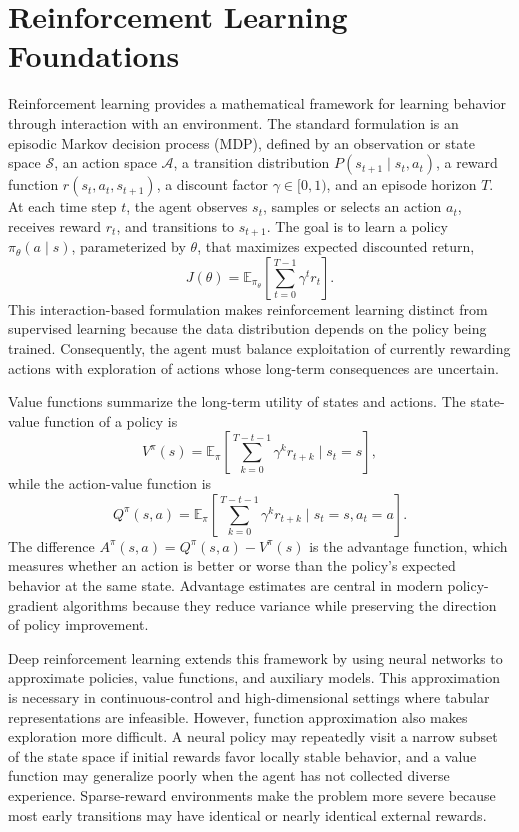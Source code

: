 \section{Reinforcement Learning Foundations}
\label{sec:reinforcement_learning_foundations}

Reinforcement learning provides a mathematical framework for learning behavior through interaction with an environment.
The standard formulation is an episodic Markov decision process (MDP), defined by an observation or state space $\mathcal{S}$, an action space $\mathcal{A}$, a transition distribution $P(s_{t+1}\mid s_t,a_t)$, a reward function $r(s_t,a_t,s_{t+1})$, a discount factor $\gamma\in[0,1)$, and an episode horizon $T$.
At each time step $t$, the agent observes $s_t$, samples or selects an action $a_t$, receives reward $r_t$, and transitions to $s_{t+1}$.
The goal is to learn a policy $\pi_\theta(a\mid s)$, parameterized by $\theta$, that maximizes expected discounted return,
\begin{equation}
    J(\theta)=\mathbb{E}_{\pi_\theta}\left[\sum_{t=0}^{T-1}\gamma^t r_t\right].
\end{equation}
This interaction-based formulation makes reinforcement learning distinct from supervised learning because the data distribution depends on the policy being trained.
Consequently, the agent must balance exploitation of currently rewarding actions with exploration of actions whose long-term consequences are uncertain.

Value functions summarize the long-term utility of states and actions.
The state-value function of a policy is
\begin{equation}
    V^\pi(s)=\mathbb{E}_{\pi}\left[\sum_{k=0}^{T-t-1}\gamma^k r_{t+k}\mid s_t=s\right],
\end{equation}
while the action-value function is
\begin{equation}
    Q^\pi(s,a)=\mathbb{E}_{\pi}\left[\sum_{k=0}^{T-t-1}\gamma^k r_{t+k}\mid s_t=s, a_t=a\right].
\end{equation}
The difference $A^\pi(s,a)=Q^\pi(s,a)-V^\pi(s)$ is the advantage function, which measures whether an action is better or worse than the policy's expected behavior at the same state.
Advantage estimates are central in modern policy-gradient algorithms because they reduce variance while preserving the direction of policy improvement.

Deep reinforcement learning extends this framework by using neural networks to approximate policies, value functions, and auxiliary models.
This approximation is necessary in continuous-control and high-dimensional settings where tabular representations are infeasible.
However, function approximation also makes exploration more difficult.
A neural policy may repeatedly visit a narrow subset of the state space if initial rewards favor locally stable behavior, and a value function may generalize poorly when the agent has not collected diverse experience.
Sparse-reward environments make the problem more severe because most early transitions may have identical or nearly identical external rewards.

